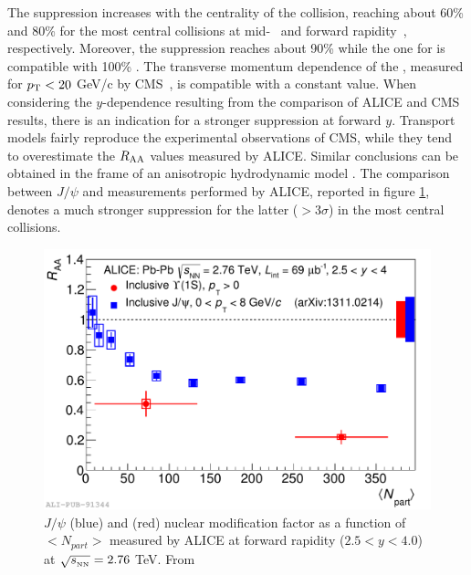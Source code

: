 The suppression increases with the centrality of the collision, reaching about 60\% and 80\% for the most central collisions at mid-~\cite{Khachatryan:2016xxp} and forward rapidity~\cite{Abelev:2014nua}, respectively. 
Moreover, the \upsiss suppression reaches about 90\% while the one for \upsisss is compatible with 100\% \cite{Khachatryan:2016xxp}. 
The transverse momentum dependence of the \upsis \raa, measured for $p_{\rm T}<20$ GeV/c by CMS~\cite{Khachatryan:2016xxp}, is compatible with a constant value. 
When considering the $y$-dependence resulting from the comparison of ALICE and CMS results, there is an indication for a stronger suppression at forward $y$.
Transport models \cite{Zhou:2014kka,Du:2017qkv} fairly reproduce the experimental observations of CMS, while they tend to overestimate the $R_{\rm AA}$ values measured by ALICE. 
Similar conclusions can be obtained in the frame of an anisotropic hydrodynamic model \cite{Krouppa:2017jlg}. 
The comparison between $J/\psi$ and \upsis measurements performed by ALICE, reported in figure \ref{fig:ALICE_jpsi_upsi}, denotes a much stronger suppression for the latter ($>3\sigma$) in the most central collisions.

\begin{figure}[!t]
\begin{center}
\includegraphics[width=0.8\linewidth]{Chapters/Analysis/Figs/2014-Dec-16-Raa_Jpsi_centr.pdf}
\caption{$J/\psi$ (blue) and \upsis (red) nuclear modification factor as a function of $<N_{part}>$ measured by ALICE at forward rapidity ($2.5<y<4.0$) at $\sqrt{s_{_{\rm NN}}}=2.76$ \rm{TeV}. From \cite{Abelev:2014nua}}
\label{fig:ALICE_jpsi_upsi}
\end{center}
\end{figure}


